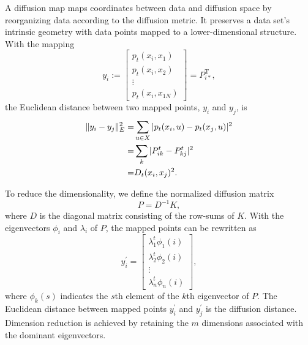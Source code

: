 A diffusion map maps coordinates between data and diffusion space by reorganizing data according to the diffusion metric. It preserves a data set's intrinsic geometry with data points mapped to a lower-dimensional structure. With the mapping
\begin{equation}
	y_i := \begin{bmatrix}
		p_t(x_i, x_{1}) \\
		p_t(x_i, x_{2}) \\
		\vdots \\
		p_t(x_i, x_{1N})
	\end{bmatrix}=P_{i\ast}^{\operatorname{T}},
\end{equation}
the Euclidean distance between two mapped points, $y_i$ and $y_j$, is
\begin{align}
	\lVert y_i-y_j\rVert_E^2=&\sum_{u\in X} |p_t(x_i,u)-p_t(x_j,u)|^2\notag\\
	                        =&\sum_k |P_{ik}^t-P_{kj}^t|^2\notag\\
	                        =&D_t(x_i,x_j)^2.
\end{align}

To reduce the dimensionality, we define the normalized diffusion matrix
\begin{equation}
	P=D^{-1}K,
\end{equation}
where $D$ is the diagonal matrix consisting of the row-sums of $K$. With the eigenvectors $\phi_i$ and $\lambda_i$ of $P$, the mapped points can be rewritten as
\begin{equation}
	y_i^\prime=\begin{bmatrix}
		\lambda_1^t\phi_1(i) \\
		\lambda_2^t\phi_2(i) \\
		\vdots \\
		\lambda_n^t\phi_n(i)
	\end{bmatrix},
\end{equation}
where $\phi_k(s)$ indicates the $s$th element of the $k$th eigenvector of $P$. The Euclidean distance between mapped points $y_i^\prime$ and $y_j^\prime$ is the diffusion distance. Dimension reduction is achieved by retaining the $m$ dimensions associated with the dominant eigenvectors.